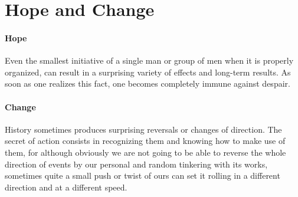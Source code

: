 \section{Hope and Change}

\paragraph{Hope}
\begin{quotex}
Even the smallest initiative of a single man or group of men when it is properly organized, can result in a surprising variety of effects and long-term results. As soon as one realizes this fact, one becomes completely immune against despair. 

\end{quotex}
\paragraph{Change}
\begin{quotex}
History sometimes produces surprising reversals or changes of direction. The secret of action consists in recognizing them and knowing how to make use of them, for although obviously we are not going to be able to reverse the whole direction of events by our personal and random tinkering with its works, sometimes quite a small push or twist of ours can set it rolling in a different direction and at a different speed. 

\end{quotex}


